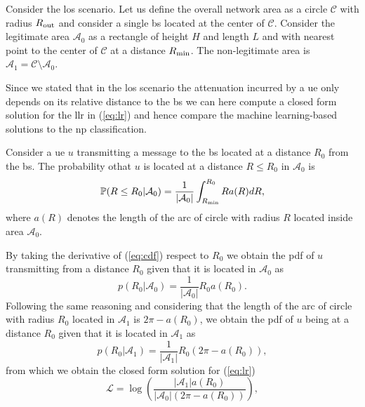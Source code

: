\documentclass[draftcls,onecolumn,12pt]{IEEEtran}
\begin{document}
Consider the \ac{los} scenario. Let us define the overall network area as a circle $\mathcal{C}$ with radius $R_{\rm out}$ and consider a single \ac{bs} located at the center of $\mathcal{C}$. Consider the legitimate area $\mathcal{A}_{0}$ as a rectangle of height $H$ and length $L$ and with nearest point to the center of $\mathcal{C}$ at a distance $R_{\rm min}$. The non-legitimate area is $\mathcal{A}_1 = \mathcal{C} \setminus \mathcal{A}_0$.

Since we stated that in the \ac{los} scenario the attenuation incurred by a \ac{ue} only depends on its relative distance to the \ac{bs} we can here compute a closed form solution for the \ac{llr} in (\ref{eq:lr}) and hence compare the machine learning-based solutions to the \ac{np} classification.

Consider a \ac{ue} $u$ transmitting a message to the \ac{bs} located at a distance $R_0$ from the \ac{bs}. The probability othat $u$ is located at a distance $R\le R_0$ in $\mathcal{A}_0$ is
\begin{equation}\label{eq:cdf}
     \mathbb{P}(R \le R_0|\mathcal{A}_0) = \frac{1}{|\mathcal{A}_0|}\int_{R_{\rm min}}^{R_0} R a(R) dR,
\end{equation}
where $a(R)$ denotes the length of the arc of circle with radius $R$ located inside area $\mathcal{A}_0$.

By taking the derivative of (\ref{eq:cdf}) respect to $R_0$ we obtain the \ac{pdf} of $u$ transmitting from a distance $R_0$ given that it is located in $\mathcal{A}_0$ as
\begin{equation}
    p(R_0|\mathcal{A}_0) = \frac{1}{|\mathcal{A}_0|}R_0a(R_0).
\end{equation}
Following the same reasoning and considering that the length of the arc of circle with radius $R_0$ located in $\mathcal{A}_1$ is $2\pi - a(R_0)$, we obtain the \ac{pdf} of $u$ being at a distance $R_0$ given that it is located in $\mathcal{A}_1$ as
\begin{equation}
     p(R_0|\mathcal{A}_1) = \frac{1}{|\mathcal{A}_1|}R_0\left(2\pi-a(R_0)\right),
\end{equation}
from which we obtain the closed form solution for (\ref{eq:lr}) 
\begin{equation}
    \mathcal{L}=\log\left(\frac{|\mathcal{A}_1|a(R_0)}{|\mathcal{A}_0|\left(2\pi-a(R_0)\right)}\right),
\end{equation}
\end{document}
